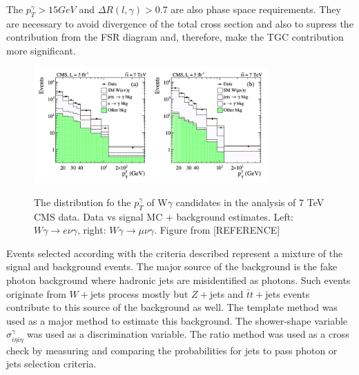 The $p_T^\gamma>15 GeV$ and  $\Delta R(l,\gamma)>$0.7 are also phase space requirements. They are necessary to avoid divergence of the total cross section and also to supress the contribution from the FSR diagram and, therefore, make the TGC contribution more significant.\\





 \begin{figure}[htb]
  \begin{center}
    {\includegraphics[width=0.80\textwidth]{../figs/WgAbout/Wg7TeV_CMS_ptGamma.png}}
    \caption{The distribution fo the $p_T^\gamma$ of W$\gamma$ candidates in the analysis of 7 TeV CMS data. Data vs signal MC + background estimates. Left: $W\gamma\rightarrow e\nu\gamma$, right: $W\gamma\rightarrow \mu\nu\gamma$. Figure from [REFERENCE]}
    \label{fig:Wg7TeV_CMS_ptGamma}
  \end{center}
\end{figure}



Events selected according with the criteria described represent a mixture of the signal and background events. The major source of the background is the fake photon background where hadronic jets are misidentified as photons. Such events originate from $W+$jets process mostly but $Z+$jets and $\bar{t}t+$jets events contribute to this source of the background as well. The template method was used as a major method to estimate this background. The shower-shape variable $\sigma_{i\eta i\eta}^{\gamma}$ was used as a discrimination variable. The ratio method was used as a cross check by measuring and comparing the probabilities for jets to pass photon or jets selection criteria. \\

